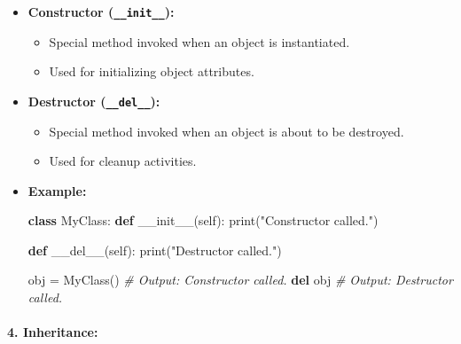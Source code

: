\documentclass[11pt]{article}
\providecommand{\tightlist}{%
      \setlength{\itemsep}{0pt}\setlength{\parskip}{0pt}}
\newenvironment{Shaded}{}{}
\newcommand{\KeywordTok}[1]{\textcolor[rgb]{0.00,0.44,0.13}{\textbf{{#1}}}}
\newcommand{\StringTok}[1]{\textcolor[rgb]{0.25,0.44,0.63}{{#1}}}
\newcommand{\CommentTok}[1]{\textcolor[rgb]{0.38,0.63,0.69}{\textit{{#1}}}}
\newcommand{\FunctionTok}[1]{\textcolor[rgb]{0.02,0.16,0.49}{{#1}}}
\newcommand{\NormalTok}[1]{{#1}}
\newcommand{\VariableTok}[1]{\textcolor[rgb]{0.10,0.09,0.49}{{#1}}}
\newcommand{\OperatorTok}[1]{\textcolor[rgb]{0.40,0.40,0.40}{{#1}}}
\newcommand{\BuiltInTok}[1]{{#1}}
\begin{document}
\begin{itemize}
\item
  \textbf{Constructor (\texttt{\_\_init\_\_}):}

  \begin{itemize}
  \tightlist
  \item
    Special method invoked when an object is instantiated.
  \item
    Used for initializing object attributes.
  \end{itemize}
\item
  \textbf{Destructor (\texttt{\_\_del\_\_}):}

  \begin{itemize}
  \tightlist
  \item
    Special method invoked when an object is about to be destroyed.
  \item
    Used for cleanup activities.
  \end{itemize}
\item
  \textbf{Example:}

\begin{Shaded}
\begin{Highlighting}[]
\KeywordTok{class}\NormalTok{ MyClass:}
    \KeywordTok{def} \FunctionTok{__init__}\NormalTok{(}\VariableTok{self}\NormalTok{):}
        \BuiltInTok{print}\NormalTok{(}\StringTok{"Constructor called."}\NormalTok{)}

    \KeywordTok{def} \FunctionTok{__del__}\NormalTok{(}\VariableTok{self}\NormalTok{):}
        \BuiltInTok{print}\NormalTok{(}\StringTok{"Destructor called."}\NormalTok{)}

\NormalTok{obj }\OperatorTok{=}\NormalTok{ MyClass()  }\CommentTok{# Output: Constructor called.}
\KeywordTok{del}\NormalTok{ obj  }\CommentTok{# Output: Destructor called.}
\end{Highlighting}
\end{Shaded}
\end{itemize}

\paragraph{\texorpdfstring{4.
\textbf{Inheritance:}}{4. Inheritance:}}\label{inheritance}
\end{document}
